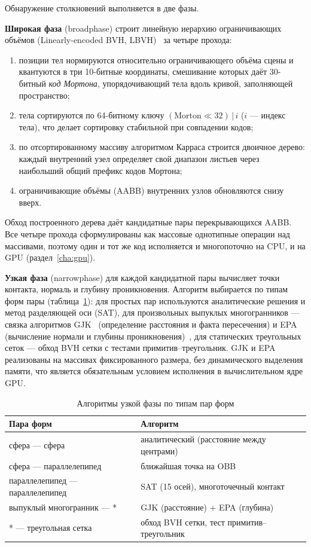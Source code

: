 Обнаружение столкновений выполняется в две фазы.

\textbf{Широкая фаза} (broadphase) строит линейную иерархию ограничивающих
объёмов (Linearly-encoded BVH, LBVH)~\cite{karras2012} за четыре прохода:
\begin{enumerate}
  \item позиции тел нормируются относительно ограничивающего объёма сцены и
        квантуются в три 10-битные координаты, смешивание которых даёт
        30-битный \emph{код Мортона}, упорядочивающий тела вдоль кривой,
        заполняющей пространство;
  \item тела сортируются по 64-битному ключу
        $(\text{Morton} \ll 32)\,|\,i$ ($i$ --- индекс тела), что делает
        сортировку стабильной при совпадении кодов;
  \item по отсортированному массиву алгоритмом Карраса строится двоичное
        дерево: каждый внутренний узел определяет свой диапазон листьев через
        наибольший общий префикс кодов Мортона;
  \item ограничивающие объёмы (AABB) внутренних узлов обновляются снизу вверх.
\end{enumerate}
Обход построенного дерева даёт кандидатные пары перекрывающихся AABB. Все
четыре прохода сформулированы как массовые однотипные операции над массивами,
поэтому один и тот же код исполняется и многопоточно на CPU, и на GPU
(раздел~\ref{cha:gpu}).

\textbf{Узкая фаза} (narrowphase) для каждой кандидатной пары вычисляет точки
контакта, нормаль и глубину проникновения. Алгоритм выбирается по типам форм
пары (таблица~\ref{tab:narrowphase}): для простых пар используются
аналитические решения и метод разделяющей оси (SAT), для произвольных выпуклых
многогранников --- связка алгоритмов GJK~\cite{gilbert1988fast} (определение
расстояния и факта пересечения) и EPA (вычисление нормали и глубины
проникновения)~\cite{ericson2004real}, для статических треугольных сеток ---
обход BVH сетки с тестами примитив--треугольник. GJK и EPA реализованы на
массивах фиксированного размера, без динамического выделения памяти, что
является обязательным условием исполнения в вычислительном ядре GPU.

\begin{table}[ht]
  \centering
  \caption{Алгоритмы узкой фазы по типам пар форм}
  \label{tab:narrowphase}
  \small
  \begin{tabular}{p{} p{}}
    \toprule
    Пара форм & Алгоритм \\
    \midrule
    сфера --- сфера & аналитический (расстояние между центрами) \\
    сфера --- параллелепипед & ближайшая точка на OBB \\
    параллелепипед --- параллелепипед & SAT (15 осей), многоточечный контакт \\
    выпуклый многогранник --- * & GJK (расстояние) + EPA (глубина) \\
    * --- треугольная сетка & обход BVH сетки, тест примитив--треугольник \\
    \bottomrule
  \end{tabular}
\end{table}

